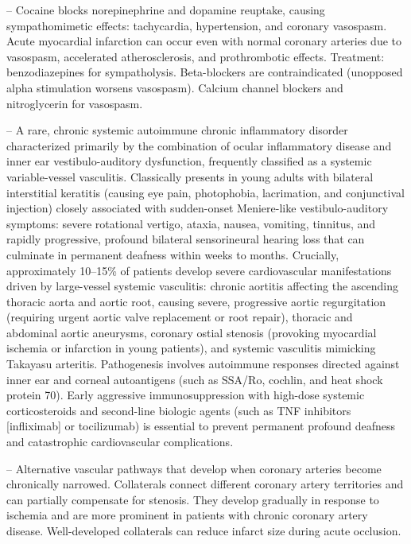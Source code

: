 -- Cocaine blocks norepinephrine and dopamine reuptake, causing sympathomimetic effects: tachycardia, hypertension, and coronary vasospasm. Acute myocardial infarction can occur even with normal coronary arteries due to vasospasm, accelerated atherosclerosis, and prothrombotic effects. Treatment: benzodiazepines for sympatholysis. Beta-blockers are contraindicated (unopposed alpha stimulation worsens vasospasm). Calcium channel blockers and nitroglycerin for vasospasm.

-- A rare, chronic systemic autoimmune chronic inflammatory disorder characterized primarily by the combination of ocular inflammatory disease and inner ear vestibulo-auditory dysfunction, frequently classified as a systemic variable-vessel vasculitis. Classically presents in young adults with bilateral interstitial keratitis (causing eye pain, photophobia, lacrimation, and conjunctival injection) closely associated with sudden-onset Meniere-like vestibulo-auditory symptoms: severe rotational vertigo, ataxia, nausea, vomiting, tinnitus, and rapidly progressive, profound bilateral sensorineural hearing loss that can culminate in permanent deafness within weeks to months. Crucially, approximately 10--15\% of patients develop severe cardiovascular manifestations driven by large-vessel systemic vasculitis: chronic aortitis affecting the ascending thoracic aorta and aortic root, causing severe, progressive aortic regurgitation (requiring urgent aortic valve replacement or root repair), thoracic and abdominal aortic aneurysms, coronary ostial stenosis (provoking myocardial ischemia or infarction in young patients), and systemic vasculitis mimicking Takayasu arteritis. Pathogenesis involves autoimmune responses directed against inner ear and corneal autoantigens (such as SSA/Ro, cochlin, and heat shock protein 70). Early aggressive immunosuppression with high-dose systemic corticosteroids and second-line biologic agents (such as TNF inhibitors [infliximab] or tocilizumab) is essential to prevent permanent profound deafness and catastrophic cardiovascular complications.

-- Alternative vascular pathways that develop when coronary arteries become chronically narrowed. Collaterals connect different coronary artery territories and can partially compensate for stenosis. They develop gradually in response to ischemia and are more prominent in patients with chronic coronary artery disease. Well-developed collaterals can reduce infarct size during acute occlusion.

